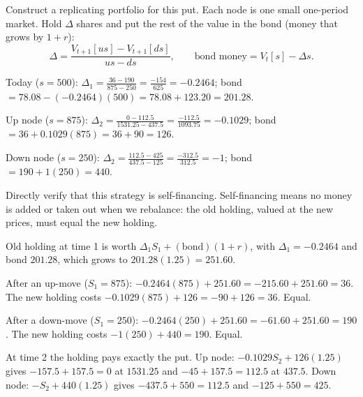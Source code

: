 \begin{problem}[Q3(ii)]
Construct a replicating portfolio for this put.
\cardsays Each node is one small one-period market. Hold $\Delta$ shares and put the rest of the value in the bond (money that grows by $1+r$):
\[
\Delta=\frac{V_{t+1}[us]-V_{t+1}[ds]}{us-ds},\qquad\text{bond money}=V_t[s]-\Delta s.
\]
\working
\begin{steps}
\item Today ($s=500$): $\Delta_1=\frac{36-190}{875-250}=\frac{-154}{625}=-0.2464$; bond $=78.08-(-0.2464)(500)=78.08+123.20=201.28$.
\item Up node ($s=875$): $\Delta_2=\frac{0-112.5}{1531.25-437.5}=\frac{-112.5}{1093.75}=-0.1029$; bond $=36+0.1029(875)=36+90=126$.
\item Down node ($s=250$): $\Delta_2=\frac{112.5-425}{437.5-125}=\frac{-312.5}{312.5}=-1$; bond $=190+1(250)=440$.
\end{steps}
\end{problem}

\begin{problem}[Q3(iii)]
Directly verify that this strategy is self-financing.
\cardsays Self-financing means no money is added or taken out when we rebalance: the old holding, valued at the new prices, must equal the new holding.
\working
\begin{steps}
\item Old holding at time 1 is worth $\Delta_1S_1+(\text{bond})(1+r)$, with $\Delta_1=-0.2464$ and bond $201.28$, which grows to $201.28(1.25)=251.60$.
\item After an up-move ($S_1=875$): $-0.2464(875)+251.60=-215.60+251.60=36$. The new holding costs $-0.1029(875)+126=-90+126=36$. Equal.
\item After a down-move ($S_1=250$): $-0.2464(250)+251.60=-61.60+251.60=190$. The new holding costs $-1(250)+440=190$. Equal.
\item At time 2 the holding pays exactly the put. Up node: $-0.1029S_2+126(1.25)$ gives $-157.5+157.5=0$ at $1531.25$ and $-45+157.5=112.5$ at $437.5$. Down node: $-S_2+440(1.25)$ gives $-437.5+550=112.5$ and $-125+550=425$.
\end{steps}
\end{problem}

